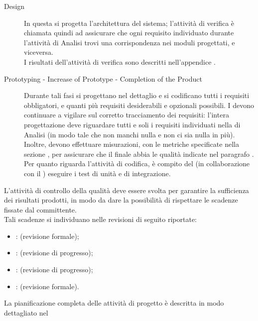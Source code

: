 \begin{description}
		\item[  Design] In questa  si progetta l'architettura del sistema; l'attività di verifica è chiamata quindi ad assicurare che ogni requisito individuato durante l'attività di Analisi trovi una corrispondenza nei moduli progettati, e viceversa. \\
		I risultati dell'attività di verifica sono descritti nell'appendice .\\
		\item[ Prototyping - Increase of Prototype - Completion of the Product] Durante tali fasi si progettano nel dettaglio e si codificano tutti i requisiti obbligatori, e quanti più requisiti desiderabili e opzionali possibili.
		I  devono continuare a vigilare sul corretto tracciamento dei requisiti: l'intera progettazione deve riguardare tutti e soli i requisiti individuati nella  di Analisi (in modo tale che non manchi nulla e non ci sia nulla in più). Inoltre, devono effettuare misurazioni, con le metriche specificate nella sezione , per assicurare che il  finale abbia le qualità indicate nel paragrafo .
		Per quanto riguarda l'attività di codifica, è compito del  (in collaborazione con il ) eseguire i test di unità e di integrazione.\\
		\end{description}
			L'attività di controllo della qualità deve essere svolta per garantire la sufficienza dei risultati prodotti, in modo da dare la possibilità di rispettare le scadenze fissate dal committente.\\
			Tali scadenze si individuano nelle revisioni di seguito riportate:
			\begin{itemize}
				\item {}:  (revisione formale);
				\item {}:  (revisione di progresso);
				\item {}:  (revisione di progresso);
				\item {}:  (revisione formale).
			\end{itemize}
			La pianificazione completa delle attività di progetto è descritta in modo dettagliato nel 
